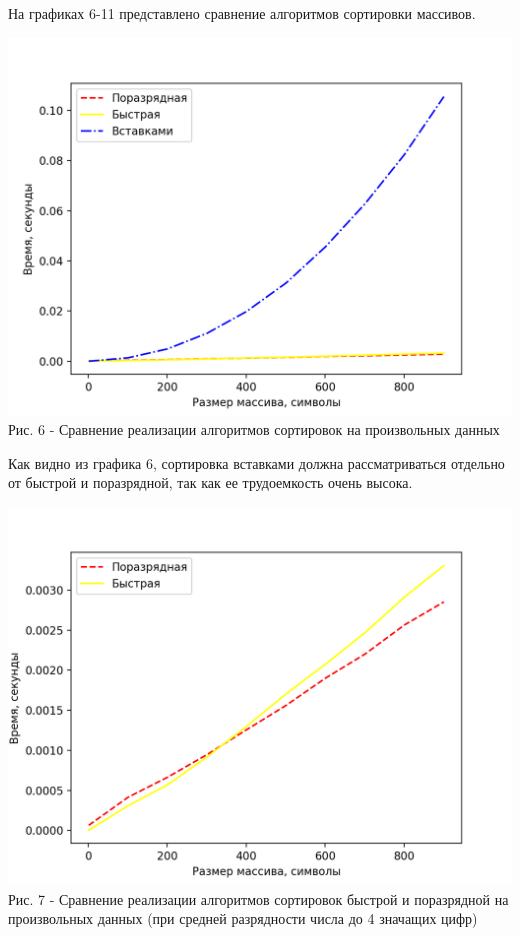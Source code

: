 \documentclass[a4paper,14pt]{article} %
\begin{document}
	На графиках 6-11 представлено сравнение алгоритмов сортировки массивов. 
	\begin{center}
        		\includegraphics[scale = 1]{graph1} \\ Рис. 6 - Сравнение реализации алгоритмов сортировок на произвольных данных
	\end{center}
	
	Как видно из графика 6, сортировка вставками должна рассматриваться отдельно от быстрой и поразрядной, так как ее трудоемкость очень высока. 
	
	\begin{center}
        		\includegraphics[scale = 1]{graph2} \\ Рис. 7 - Сравнение реализации алгоритмов сортировок быстрой и поразрядной на произвольных данных (при средней разрядности числа до 4 значащих цифр)
	\end{center}
	
\end{document}
